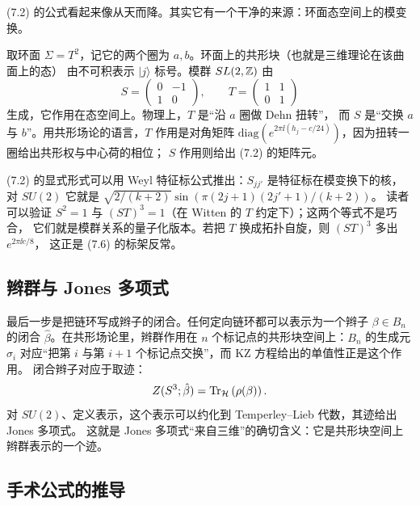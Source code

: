 (7.2) 的公式看起来像从天而降。其实它有一个干净的来源：环面态空间上的模变换。

取环面 $\Sigma=T^2$，记它的两个圈为 $a,b$。环面上的共形块（也就是三维理论在该曲面上的态）
由不可积表示 $|j\rangle$ 标号。模群 $SL(2,\mathbb{Z})$ 由
\[
S=\begin{pmatrix}0&-1\\1&0\end{pmatrix},\qquad
T=\begin{pmatrix}1&1\\0&1\end{pmatrix}
\]
生成，它作用在态空间上。物理上，$T$ 是“沿 $a$ 圈做 Dehn 扭转”，
而 $S$ 是“交换 $a$ 与 $b$”。用共形场论的语言，$T$ 作用是对角矩阵
$\mathrm{diag}(e^{2\pi\ii(h_j-c/24)})$，因为扭转一圈给出共形权与中心荷的相位；
$S$ 作用则给出 (7.2) 的矩阵元。

(7.2) 的显式形式可以用 Weyl 特征标公式推出：$S_{jj'}$ 是特征标在模变换下的核，
对 $SU(2)$ 它就是 $\sqrt{2/(k+2)}\sin(\pi(2j+1)(2j'+1)/(k+2))$。
读者可以验证 $S^2=1$ 与 $(ST)^3=1$（在 Witten 的 $T$ 约定下）；这两个等式不是巧合，
它们就是模群关系的量子化版本。若把 $T$ 换成拓扑自旋，则 $(ST)^3$ 多出 $e^{2\pi\ii c/8}$，
这正是 (7.6) 的标架反常。

\subsection{辫群与 Jones 多项式}

最后一步是把链环写成辫子的闭合。任何定向链环都可以表示为一个辫子 $\beta\in B_n$ 的闭合
$\hat\beta$。在共形场论里，辫群作用在 $n$ 个标记点的共形块空间上：$B_n$ 的生成元
$\sigma_i$ 对应“把第 $i$ 与第 $i+1$ 个标记点交换”，而 KZ 方程给出的单值性正是这个作用。
闭合辫子对应于取迹：
\[
Z(S^3;\hat\beta)=\operatorname{Tr}_{\mathcal{H}}\left(\rho(\beta)\right).
\]
对 $SU(2)$、定义表示，这个表示可以约化到 Temperley--Lieb 代数，其迹给出 Jones 多项式。
这就是 Jones 多项式“来自三维”的确切含义：它是共形块空间上辫群表示的一个迹。

\subsection{手术公式的推导}

